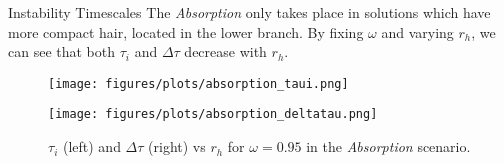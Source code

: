 \begin{block}{Instability Timescales}
The \textit{Absorption} only takes place in solutions which have more compact hair, located in the lower branch. By fixing $\omega$ and varying $r_h$, we can see that both $\tau_i$ and $\Delta \tau$ decrease with $r_h$.

\begin{figure}[h!]
    \centering
    \begin{minipage}[b]{0.49\textwidth}
        \centering
        \texttt{[image: figures/plots/absorption\_taui.png]}
    \end{minipage}
    \hfill
    \begin{minipage}[b]{0.49\textwidth}
        \centering
        \texttt{[image: figures/plots/absorption\_deltatau.png]}
    \end{minipage}
    \caption{$\tau_i$ (left) and $\Delta \tau$ (right) vs $r_h$ for $\omega = 0.95$ in the \textit{Absorption} scenario.}
\end{figure}

\vspace{-1em}  %

\end{block}
